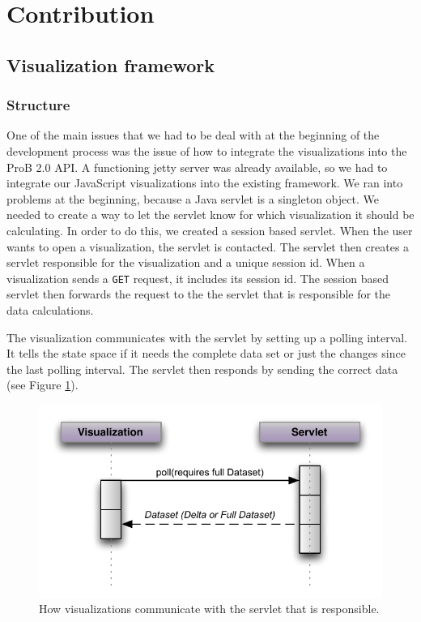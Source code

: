 \section{Contribution}

\subsection{Visualization framework}

\subsubsection{Structure}

One of the main issues that we had to be deal with at the beginning of the development process was the issue of how to integrate the visualizations into the ProB 2.0 API. A functioning jetty server was already available, so we had to integrate our JavaScript visualizations into the existing framework. We ran into problems at the beginning, because a Java servlet is a singleton object. We needed to create a way to let the servlet know for which visualization it should be calculating. In order to do this, we created a session based servlet. When the user wants to open a visualization, the servlet is contacted. The servlet then creates a servlet responsible for the visualization and a unique session id. When a visualization sends a \texttt{GET} request, it includes its session id. The session based servlet then forwards the request to the the servlet that is responsible for the data calculations.

The visualization communicates with the servlet by setting up a polling interval. It tells the state space if it needs the complete data set or just the changes since the last polling interval. The servlet then responds by sending the correct data (see Figure \ref{communication}).

\begin{figure}[h!]
\centering
\includegraphics[width=14cm]{bilder/communication.pdf}
\caption{How visualizations communicate with the servlet that is responsible.}
\label{communication}
\end{figure}


